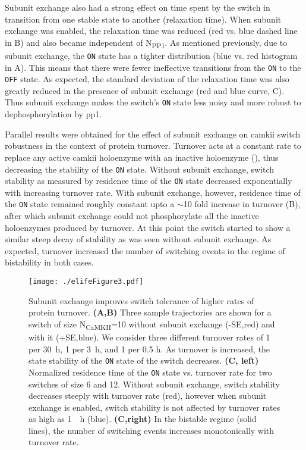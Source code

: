 \documentclass[9pt,lineno,doublespacing]{elife}
\newcommand\SUB[2]{#1\textsubscript{#2}}
\begin{document}
Subunit exchange also had a strong effect on time spent by the switch in
transition from one stable state to another (relaxation time). When subunit
exchange was enabled, the relaxation time was reduced (red vs. blue dashed line
in B) and also became independent of \SUB{N}{PP1}. As
mentioned previously, due to subunit exchange, the \texttt{ON} state has a
tighter distribution (blue vs. red histogram in A). This
means that there were fewer ineffective transitions from the \texttt{ON} to the
\texttt{OFF} state. As expected, the standard deviation of the relaxation time
was also greatly reduced in the presence of subunit exchange (red and blue
curve, C). Thus subunit exchange makes the switch's
\texttt{ON} state less noisy and more robust to dephosphorylation by \gls{pp1}.

Parallel results were obtained for the effect of subunit exchange on
\gls{camkii} switch robustness in the context of protein turnover. Turnover acts
at a constant rate to replace any active \gls{camkii} holoenzyme with an
inactive holoenzyme (), thus decreasing the stability of the
\texttt{ON} state. Without subunit exchange, switch stability as measured by
residence time of the \texttt{ON} state decreased exponentially with increasing
turnover rate.  With subunit exchange, however, residence time of the
\texttt{ON} state remained roughly constant upto a $\sim$10 fold increase in
turnover (B), after which subunit exchange could not phosphorylate
all the inactive holoenzymes produced by turnover. At this point the switch
started to show a similar steep decay of stability as was seen without subunit
exchange. As expected, turnover increased the number of switching events in the
regime of bistability in both cases.

\begin{figure}[th!]
    \texttt{[image: ./elifeFigure3.pdf]}
    \caption{Subunit exchange improves switch tolerance of higher rates of
        protein turnover.
        \textbf{(A,B)} Three sample trajectories are shown for a switch of 
        size \SUB{N}{CaMKII}=10 without subunit exchange
        (-SE,red) and with it (+SE,blue). We consider three different 
        turnover rates of 1 per \SI{30}{\hour}, 1 per \SI{3}{\hour}, 
        and 1 per 0.5 \si{\hour}. As turnover is increased, the state stability 
        of the \texttt{ON} state of the switch decreases.
        \textbf{(C, left)} Normalized residence time of the \texttt{ON} state vs. turnover
        rate for two switches of size 6 and 12. Without subunit exchange, switch
        stability decreases steeply with turnover rate (red), however when
        subunit exchange is enabled, switch stability is not affected by
        turnover rates as high as \SI{1}{\per \hour} (blue). \textbf{(C,right)} In
        the bistable regime (solid lines), the number of switching events
        increases monotonically with turnover rate.
    }\label{fig:turnover}
\end{figure}
\end{document}

